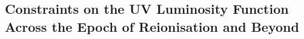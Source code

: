 \documentclass[12pt]{article}
\begin{document}
\subsection*{Constraints on the UV Luminosity Function Across the Epoch of Reionisation and Beyond}\label{sec:UVLF}




\end{document}
